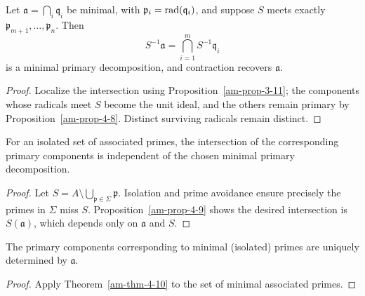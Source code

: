 \begin{proposition}
\label{am-prop-4-9}
\uses{}
Let $\mathfrak{a}=\bigcap_i\mathfrak{q}_i$ be minimal, with $\mathfrak{p}_i=\operatorname{rad}(\mathfrak{q}_i)$, and suppose
$S$ meets exactly $\mathfrak{p}_{m+1},\ldots,\mathfrak{p}_n$.  Then
\[
S^{-1}\mathfrak{a}=\bigcap_{i=1}^mS^{-1}\mathfrak{q}_i
\]
is a minimal primary decomposition, and contraction recovers $\mathfrak{a}$.
\end{proposition}
\begin{proof}
Localize the intersection using Proposition~\ref{am-prop-3-11}; the components
whose radicals meet $S$ become the unit ideal, and the others remain primary by
Proposition~\ref{am-prop-4-8}.  Distinct surviving radicals remain distinct.
\end{proof}
\begin{theorem}
\label{am-thm-4-10}
\uses{}
For an isolated set of associated primes, the intersection of the corresponding
primary components is independent of the chosen minimal primary decomposition.
\end{theorem}
\begin{proof}
Let $S=A\setminus\bigcup_{\mathfrak{p}\in\Sigma}\mathfrak{p}$.  Isolation and prime avoidance
ensure precisely the primes in $\Sigma$ miss $S$.  Proposition~\ref{am-prop-4-9}
shows the desired intersection is $S(\mathfrak{a})$, which depends only on
$\mathfrak{a}$ and $S$.
\end{proof}
\begin{corollary}
\label{am-cor-4-11}
\uses{}
The primary components corresponding to minimal (isolated) primes are uniquely
determined by $\mathfrak{a}$.
\end{corollary}
\begin{proof}
Apply Theorem~\ref{am-thm-4-10} to the set of minimal associated primes.
\end{proof}
